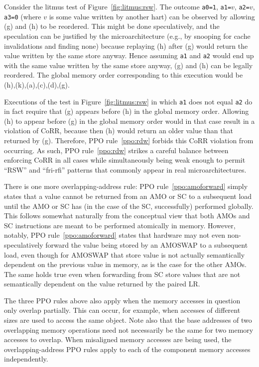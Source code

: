Consider the litmus test of Figure~\ref{fig:litmus:rsw}.
The outcome {\tt a0=1}, {\tt a1=$v$},  {\tt a2=$v$}, {\tt a3=0} (where $v$ is some value written by another hart) can be observed by allowing (g) and (h) to be reordered.  This might be done speculatively, and the speculation can be justified by the microarchitecture (e.g., by snooping for cache invalidations and finding none) because replaying (h) after (g) would return the value written by the same store anyway.
Hence assuming {\tt a1} and {\tt a2} would end up with the same value written by the same store anyway, (g) and (h) can be legally reordered.
The global memory order corresponding to this execution would be (h),(k),(a),(c),(d),(g).

Executions of the test in Figure~\ref{fig:litmus:rsw} in which {\tt a1} does not equal {\tt a2} do in fact require that (g) appears before (h) in the global memory order.
Allowing (h) to appear before (g) in the global memory order would in that case result in a violation of CoRR, because then (h) would return an older value than that returned by (g).
Therefore, PPO rule~\ref{ppo:rdw} forbids this CoRR violation from occurring.
As such, PPO rule~\ref{ppo:rdw} strikes a careful balance between enforcing CoRR in all cases while simultaneously being weak enough to permit ``RSW'' and ``fri-rfi'' patterns that commonly appear in real microarchitectures.

There is one more overlapping-address rule: PPO rule~\ref{ppo:amoforward} simply states that a value cannot be returned from an AMO or SC to a subsequent load until the AMO or SC has (in the case of the SC, successfully) performed globally.
This follows somewhat naturally from the conceptual view that both AMOs and SC instructions are meant to be performed atomically in memory.
However, notably, PPO rule~\ref{ppo:amoforward} states that hardware may not even non-speculatively forward the value being stored by an AMOSWAP to a subsequent load, even though for AMOSWAP that store value is not actually semantically dependent on the previous value in memory, as is the case for the other AMOs.
The same holds true even when forwarding from SC store values that are not semantically dependent on the value returned by the paired LR.

The three PPO rules above also apply when the memory accesses in question only overlap partially.
This can occur, for example, when accesses of different sizes are used to access the same object.
Note also that the base addresses of two overlapping memory operations need not necessarily be the same for two memory accesses to overlap.
When misaligned memory accesses are being used, the overlapping-address PPO rules apply to each of the component memory accesses independently.

